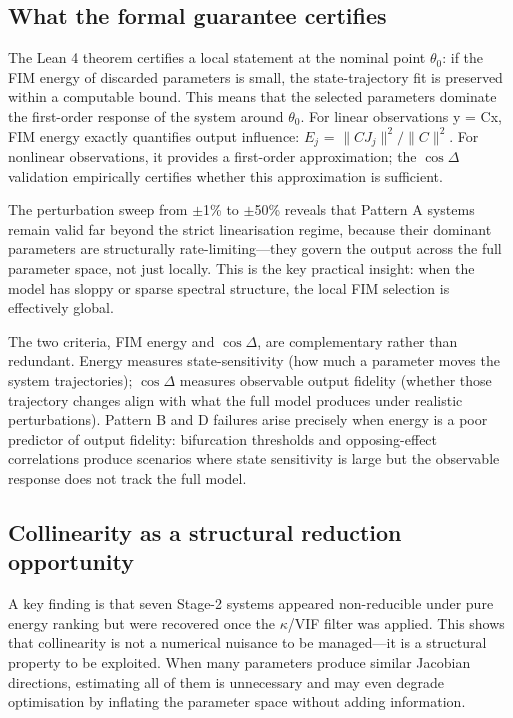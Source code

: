 \documentclass[pdflatex,sn-nature]{sn-jnl}
\begin{document}
\subsection{What the formal guarantee certifies}\label{sec:guarantee}


The Lean 4 theorem certifies a local statement at the nominal point $\theta_0$: if the FIM energy of discarded parameters is small, the state-trajectory fit is preserved within a computable bound. This means that the selected parameters dominate the first-order response of the system around $\theta_0$. For linear observations y = Cx, FIM energy exactly quantifies output influence: $E_j$ = $\|CJ_j\|^2/\|C\|^2$. For nonlinear observations, it provides a first-order approximation; the $\cos\Delta$ validation empirically certifies whether this approximation is sufficient.


The perturbation sweep from $\pm$1\% to $\pm$50\% reveals that Pattern A systems remain valid far beyond the strict linearisation regime, because their dominant parameters are structurally rate-limiting---they govern the output across the full parameter space, not just locally. This is the key practical insight: when the model has sloppy or sparse spectral structure, the local FIM selection is effectively global.


The two criteria, FIM energy and $\cos\Delta$, are complementary rather than redundant. Energy measures state-sensitivity (how much a parameter moves the system trajectories); $\cos\Delta$ measures observable output fidelity (whether those trajectory changes align with what the full model produces under realistic perturbations). Pattern B and D failures arise precisely when energy is a poor predictor of output fidelity: bifurcation thresholds and opposing-effect correlations produce scenarios where state sensitivity is large but the observable response does not track the full model.


\subsection{Collinearity as a structural reduction opportunity}\label{sec:collinearity}


A key finding is that seven Stage-2 systems appeared non-reducible under pure energy ranking but were recovered once the $\kappa$/VIF filter \cite{bib5} was applied. This shows that collinearity is not a numerical nuisance to be managed---it is a structural property to be exploited. When many parameters produce similar Jacobian directions, estimating all of them is unnecessary and may even degrade optimisation by inflating the parameter space without adding information.
\end{document}
